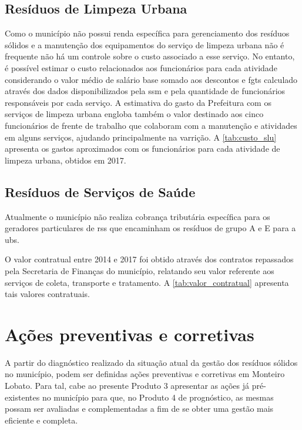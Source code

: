 \subsection{Resíduos de Limpeza Urbana}
Como o município não possui renda específica para gerenciamento dos resíduos sólidos e a manutenção dos equipamentos do serviço de limpeza urbana não é frequente não há um controle sobre o custo associado a esse serviço. No entanto, é possível estimar o custo relacionados aos funcionários para cada atividade considerando o valor médio de salário base somado aos descontos e \gls{fgts} calculado através dos dados disponibilizados pela \gls{ssm} e pela quantidade de funcionários responsáveis por cada serviço. A estimativa do gasto da Prefeitura com os serviços de limpeza urbana engloba também o valor destinado aos cinco funcionários de frente de trabalho que colaboram com a manutenção e atividades em alguns serviços, ajudando principalmente na varrição.  A \autoref{tab:custo_slu} apresenta os gastos aproximados com os funcionários para cada atividade de limpeza urbana, obtidos em 2017.



\subsection{Resíduos de Serviços de Saúde}
Atualmente o município não realiza cobrança tributária específica para os geradores particulares de \gls{rss} que encaminham os resíduos de grupo A e E para a \gls{ubs}.

O valor contratual entre 2014 e 2017 foi obtido através dos contratos repassados pela Secretaria de Finanças do município, relatando seu valor referente aos serviços de coleta, transporte e tratamento. A \autoref{tab:valor_contratual} apresenta tais valores contratuais.



\section{Ações preventivas e corretivas}
A partir do diagnóstico realizado da situação atual da gestão dos resíduos sólidos no município, podem ser definidas ações preventivas e corretivas em Monteiro Lobato. Para tal, cabe ao presente Produto 3 apresentar as ações já pré-existentes no município para que, no Produto 4 de prognóstico, as mesmas possam ser avaliadas e complementadas a fim de se obter uma gestão mais eficiente e completa.

